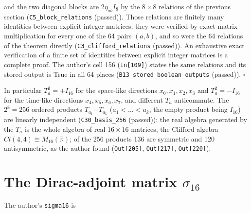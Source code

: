 \documentclass[
  10pt,
]{article}
\begin{document}
and the two diagonal blocks are \(2\eta_{ab}I_8\) by the \(8 \times 8\)
relations of the previous section (\texttt{C5\_block\_relations}
(passed)). Those relations are finitely many identities between explicit
integer matrices; they were verified by exact matrix multiplication for
every one of the 64 pairs \((a, b)\), and so were the 64 relations of
the theorem directly (\texttt{C3\_clifford\_relations} (passed)). An
exhaustive exact verification of a finite set of identities between
explicit integer matrices is a complete proof. The author's cell 156
(\texttt{In{[}109{]}}) states the same relations and its stored output
is True in all 64 places (\texttt{B13\_stored\_boolean\_outputs}
(passed)). \(\square\)

In particular \(T_a^2 = +I_{16}\) for the space-like directions
\(x_0, x_1, x_2, x_3\) and \(T_a^2 = -I_{16}\) for the time-like
directions \(x_4, x_5, x_6, x_7\), and different \(T_a\) anticommute.
The \(2^8 = 256\) ordered products \(T_{a_1}\cdots T_{a_k}\)
(\(a_1 < \dots < a_k\), the empty product being \(I_{16}\)) are linearly
independent (\texttt{C30\_basis\_256} (passed)): the real algebra
generated by the \(T_a\) is the whole algebra of real \(16 \times 16\)
matrices, the Clifford algebra \(Cl(4,4) \cong M_{16}(\mathbb R)\); of
the 256 products 136 are symmetric and 120 antisymmetric, as the author
found (\texttt{Out{[}205{]}}, \texttt{Out{[}217{]}},
\texttt{Out{[}220{]}}).

\hypertarget{the-dirac-adjoint-matrix-sigma_16}{%
\section{\texorpdfstring{The Dirac-adjoint matrix
\(\sigma_{16}\)}{The Dirac-adjoint matrix \textbackslash sigma\_\{16\}}}\label{the-dirac-adjoint-matrix-sigma_16}}

The author's \texttt{sigma16} is
\end{document}
